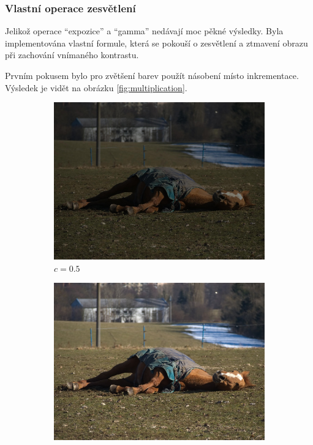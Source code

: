 \documentclass[11pt, a4paper, titlepage]{article}
\renewcommand{\uv}[1]{``#1''}
\begin{document}
\subsubsection{Vlastní operace zesvětlení}
Jelikož operace \uv{expozice} a \uv{gamma} nedávají moc pěkné výsledky.
Byla implementována vlastní formule, která se pokouší o zesvětlení a ztmavení obrazu při zachování vnímaného kontrastu.

Prvním pokusem bylo pro zvětšení barev použít násobení místo inkrementace.
Výsledek je vidět na obrázku \ref{fig:multiplication}.
\begin{figure}[h]
    \centering
    \begin{subfigure}[t]{0.24\textwidth}
        \vskip 0pt
        \includegraphics[width=1.0\textwidth]{horse_mul_down.jpg}
        \caption{$c = 0.5$}
    \end{subfigure}
    \begin{subfigure}[t]{0.24\textwidth}
        \vskip 0pt
        \includegraphics[width=1.0\textwidth]{horse_original.jpg}

\end{subfigure}
\end{figure}
\end{document}
